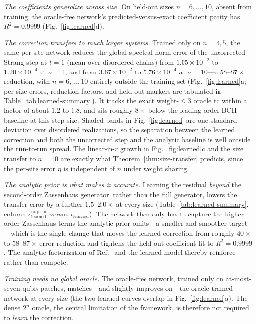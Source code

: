 \documentclass[aps,prresearch,reprint,superscriptaddress,nofootinbib,amsmath,amssymb]{revtex4-2}
\begin{document}
\emph{The coefficients generalize across size.} On held-out sizes $n=6,\dots,10$, absent from training, the oracle-free network's predicted-versus-exact coefficient parity has $R^2=0.9999$ (Fig.~\ref{fig:learned}d).

\emph{The correction transfers to much larger systems.} Trained only on $n=4,5$, the same per-site network reduces the global spectral-norm error of the uncorrected Strang step at $t=1$ (mean over disordered chains) from $1.05\times10^{-2}$ to $1.20\times10^{-4}$ at $n=4$, and from $3.67\times10^{-2}$ to $5.76\times10^{-4}$ at $n=10$---a $58$--$87\times$ reduction, with $n=6,\dots,10$ entirely outside the training set (Fig.~\ref{fig:learned}a; per-size errors, reduction factors, and held-out markers are tabulated in Table~\ref{tab:learned-summary}). It tracks the exact weight-$\leq3$ oracle to within a factor of about $1.2$ to $1.8$, and sits roughly $8\times$ below the leading-order BCH baseline at this step size. Shaded bands in Fig.~\ref{fig:learned} are one standard deviation over disordered realizations, so the separation between the learned correction and both the uncorrected step and the analytic baseline is well outside the run-to-run spread. The linear-in-$r$ growth in Fig.~\ref{fig:learned}c and the size transfer to $n=10$ are exactly what Theorem~\ref{thm:size-transfer} predicts, since the per-site error $\eta$ is independent of $n$ under weight sharing.

\emph{The analytic prior is what makes it accurate.} Learning the residual \emph{beyond} the second-order Zassenhaus generator, rather than the full generator, lowers the transfer error by a further $1.5$--$2.0\times$ at every size (Table~\ref{tab:learned-summary}, column $\epsilon^{\mathrm{no\,prior}}_{\mathrm{learned}}$ versus $\epsilon_{\mathrm{learned}}$). The network then only has to capture the higher-order Zassenhaus terms the analytic prior omits---a smaller and smoother target---which is the single change that moves the learned correction from roughly $40\times$ to $58$--$87\times$ error reduction and tightens the held-out coefficient fit to $R^2=0.9999$. The analytic factorization of Ref.~\cite{nguyen2025zassenhaus} and the learned model thereby reinforce rather than compete.

\emph{Training needs no global oracle.} The oracle-free network, trained only on at-most-seven-qubit patches, matches---and slightly improves on---the oracle-trained network at every size (the two learned curves overlap in Fig.~\ref{fig:learned}a). The dense $2^n$ oracle, the central limitation of the framework, is therefore not required to \emph{learn} the correction.
\end{document}
